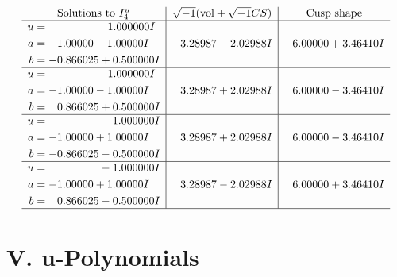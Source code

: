 \documentclass[1p]{elsarticle_modified}
\theoremstyle{definition}
\newcommand{\I}{\sqrt{-1}}
\begin{document}
$$\begin{array}{c|c|c}  
\text{Solutions to }I^u_{4}& \I (\text{vol} + \sqrt{-1}CS) & \text{Cusp shape}\\
 \hline 
\begin{aligned}
u &= \phantom{-0.000000 -}1.000000 I \\
a &= -1.00000 - 1.00000 I \\
b &= -0.866025 + 0.500000 I\end{aligned}
 & \phantom{-}3.28987 - 2.02988 I & \phantom{-}6.00000 + 3.46410 I \\ \hline\begin{aligned}
u &= \phantom{-0.000000 -}1.000000 I \\
a &= -1.00000 - 1.00000 I \\
b &= \phantom{-}0.866025 + 0.500000 I\end{aligned}
 & \phantom{-}3.28987 + 2.02988 I & \phantom{-}6.00000 - 3.46410 I \\ \hline\begin{aligned}
u &= \phantom{-0.000000 } -1.000000 I \\
a &= -1.00000 + 1.00000 I \\
b &= -0.866025 - 0.500000 I\end{aligned}
 & \phantom{-}3.28987 + 2.02988 I & \phantom{-}6.00000 - 3.46410 I \\ \hline\begin{aligned}
u &= \phantom{-0.000000 } -1.000000 I \\
a &= -1.00000 + 1.00000 I \\
b &= \phantom{-}0.866025 - 0.500000 I\end{aligned}
 & \phantom{-}3.28987 - 2.02988 I & \phantom{-}6.00000 + 3.46410 I\\
 \hline 
 \end{array}$$\newpage
\newpage\renewcommand{\arraystretch}{1}
\centering \section*{ V. u-Polynomials}
\end{document}
